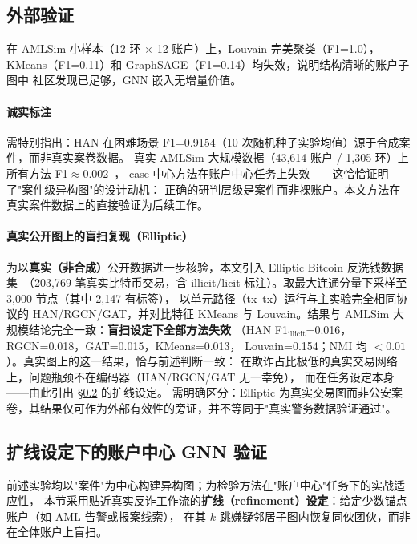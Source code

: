 \documentclass[12pt,a4paper,fontset=windows]{ctexart}
\begin{document}
\subsection{外部验证}
\label{sec:external}

在 AMLSim 小样本（12 环 $\times$ 12 账户）上，Louvain 完美聚类（F1=1.0），
KMeans（F1=0.11）和 GraphSAGE（F1=0.14）均失效，说明结构清晰的账户子图中
社区发现已足够，GNN 嵌入无增量价值。

\paragraph{诚实标注} 需特别指出：HAN 在困难场景 F1=0.9154（10 次随机种子实验均值）源于合成案件，而非真实案卷数据。
真实 AMLSim 大规模数据（43,614 账户 / 1,305 环）上所有方法 F1$\approx$0.002~\cite{weber2018amlfirstlook}，
case 中心方法在账户中心任务上失效——这恰恰证明了"案件级异构图"的设计动机：
正确的研判层级是案件而非裸账户。本文方法在真实案件数据上的直接验证为后续工作。

\paragraph{真实公开图上的盲扫复现（Elliptic）}
为以\textbf{真实（非合成）}公开数据进一步核验，本文引入 Elliptic Bitcoin
反洗钱数据集~\cite{weber2019elliptic}（203{,}769 笔真实比特币交易，含
illicit/licit 标注）。取最大连通分量下采样至 3{,}000 节点（其中 2{,}147 有标签），
以单元路径（tx--tx）运行与主实验完全相同协议的 HAN/RGCN/GAT，并对比特征
KMeans 与 Louvain。结果与 AMLSim 大规模结论完全一致：\textbf{盲扫设定下全部方法失效}
（HAN F1$_{\text{illicit}}$=0.016，RGCN=0.018，GAT=0.015，KMeans=0.013，
Louvain=0.154；NMI 均 $<0.01$）。真实图上的这一结果，恰与前述判断一致：
在欺诈占比极低的真实交易网络上，问题瓶颈不在编码器（HAN/RGCN/GAT 无一幸免），
而在任务设定本身——由此引出 §\ref{sec:refinement} 的扩线设定。
需明确区分：Elliptic 为真实交易图而非公安案卷，其结果仅可作为外部有效性的旁证，并不等同于"真实警务数据验证通过"。

\subsection{扩线设定下的账户中心 GNN 验证}
\label{sec:refinement}

前述实验均以"案件"为中心构建异构图；为检验方法在"账户中心"任务下的实战适应性，
本节采用贴近真实反诈工作流的\textbf{扩线（refinement）设定}：给定少数锚点账户（如 AML 告警或报案线索），
在其 $k$ 跳嫌疑邻居子图内恢复同伙团伙，而非在全体账户上盲扫。
\end{document}
